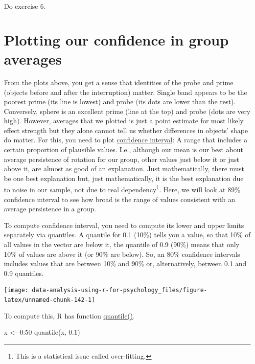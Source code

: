\documentclass[
]{book}
\newenvironment{Shaded}{\begin{snugshade}}{\end{snugshade}}
\newcommand{\DecValTok}[1]{\textcolor[rgb]{0.00,0.00,0.81}{#1}}
\newcommand{\FloatTok}[1]{\textcolor[rgb]{0.00,0.00,0.81}{#1}}
\newcommand{\FunctionTok}[1]{\textcolor[rgb]{0.00,0.00,0.00}{#1}}
\newcommand{\NormalTok}[1]{#1}
\newcommand{\OtherTok}[1]{\textcolor[rgb]{0.56,0.35,0.01}{#1}}
\newcommand{\SpecialCharTok}[1]{\textcolor[rgb]{0.00,0.00,0.00}{#1}}
\begin{document}
Do exercise 6.

\hypertarget{plotting-our-confidence-in-group-averages}{%
\section{Plotting our confidence in group averages}\label{plotting-our-confidence-in-group-averages}}

From the plots above, you get a sense that identities of the probe and prime (objects before and after the interruption) matter. Single band appears to be the poorest prime (its line is lowest) and probe (its dots are lower than the rest). Conversely, sphere is an excellent prime (line at the top) and probe (dots are very high). However, averages that we plotted is just a point estimate for most likely effect strength but they alone cannot tell us whether differences in objects' shape do matter. For this, you need to plot \href{https://en.wikipedia.org/wiki/Confidence_interval}{confidence interval}: A range that includes a certain proportion of plausible values. I.e., although our mean is our best about average persistence of rotation for our group, other values just below it or just above it, are almost as good of an explanation. Just mathematically, there must be one best explanation but, just mathematically, it is the best explanation due to noise in our sample, not due to real dependency\footnote{This is a statistical issue called over-fitting.}. Here, we will look at 89\% confidence interval to see how broad is the range of values consistent with an average persistence in a group.

To compute confidence interval, you need to compute its lower and upper limits separately via \href{https://en.wikipedia.org/wiki/Quantile}{quantiles}. A quantile for 0.1 (10\%) tells you a value, so that 10\% of all values in the vector are below it, the quantile of 0.9 (90\%) means that only 10\% of values are above it (or 90\% are below). So, an 80\% confidence intervals includes values that are between 10\% and 90\% or, alternatively, between 0.1 and 0.9 quantiles.

\begin{center}\texttt{[image: data-analysis-using-r-for-psychology\_files/figure-latex/unnamed-chunk-142-1]} \end{center}

To compute this, R has function \href{https://stat.ethz.ch/R-manual/R-devel/library/stats/html/quantile.html}{quantile()}.

\begin{Shaded}
\begin{Highlighting}[]
\NormalTok{x }\OtherTok{\textless{}{-}} \DecValTok{0}\SpecialCharTok{:}\DecValTok{50}
\FunctionTok{quantile}\NormalTok{(x, }\FloatTok{0.1}\NormalTok{)}
\end{Highlighting}
\end{Shaded}
\end{document}
